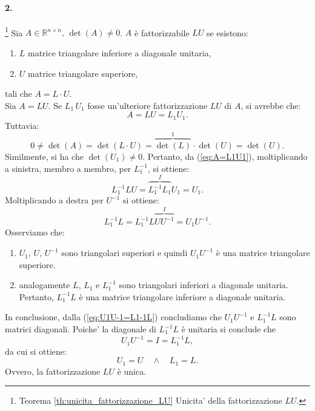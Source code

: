 \paragraph{2.}\footnote{Teorema \ref{th:unicita_fattorizzazione_LU} Unicita' della fattorizzazione $LU$.} Sia $A\in\mathbb{R}^{n \times n},\, \det(A)\neq 0$. $A$ è fattorizzabile $LU$ se esistono:
\begin{enumerate}
	\item $L$ matrice triangolare inferiore a diagonale unitaria,
	\item $U$ matrice triangolare superiore,
\end{enumerate}
tali che $A=L\cdot U$.\\
Sia $A=LU$. Se $L_1\, U_1$ fosse un'ulteriore fattorizzazione $LU$ di $A$, si avrebbe che:
\begin{equation}\label{eq:A=L1U1}
	A=LU=L_1U_1.
\end{equation}
Tuttavia:
\begin{equation*}
	0 \neq \det(A) = \det(L\cdot U) = \overbrace{\det(L)}^{1}\cdot\det(U) = \det(U).
\end{equation*}
Similmente, si ha che $\det(U_1)\neq 0$. Pertanto, da (\ref{eq:A=L1U1}), moltiplicando a sinistra, membro a membro, per $L_1^{-1}$, si ottiene:
\begin{equation*}
	L_1^{-1}LU=\overbrace{L_1^{-1}L_1}^{I}U_1 = U_1. 
\end{equation*}
Moltiplicando a destra per $U^{-1}$ si ottiene:
\begin{equation}\label{eq:U1U-1=L1-1L}
	L_1^{-1}L=L_1^{-1} L \overbrace{UU^{-1}}^{I}=U_1U^{-1}.
\end{equation}
Osserviamo che:
\begin{enumerate}
	\item $U_1,\, U,\, U^{-1}$ sono triangolari superiori e quindi $U_1U^{-1}$ è una matrice triangolare superiore.
	\item analogamente $L,\, L_1$ e $L_1^{-1}$ sono triangolari inferiori a diagonale unitaria. Pertanto, $L_1^{-1}L$ è una matrice triangolare inferiore a diagonale unitaria.
\end{enumerate}
In conclusione, dalla (\ref{eq:U1U-1=L1-1L}) concludiamo che $U_1U^{-1}$ e $L_1^{-1}L$ sono matrici diagonali. Poiche' la diagonale di $L_1^{-1}L$ è unitaria si conclude che
\begin{equation*}
	U_1U^{-1} = I = L_1^{-1}L,
\end{equation*}
da cui si ottiene:
\begin{equation*}
	U_1 = U \quad \wedge \quad L_1 = L.
\end{equation*}
Ovvero, la fattorizzazione $LU$ è unica.

